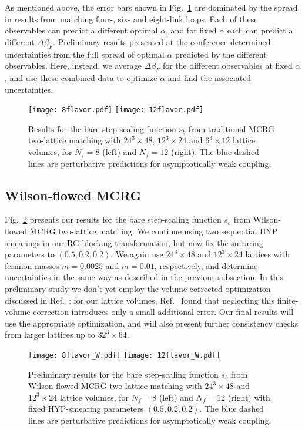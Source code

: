 \documentclass{PoS}
\newcommand{\al}{\ensuremath{\alpha} }
\newcommand{\be}{\ensuremath{\beta} }
\newcommand{\De}{\ensuremath{\Delta} }
\newcommand{\X}{\ensuremath{\!\times\!} }
\newcommand{\refcite}[1]{Ref.~\cite{#1}}
\newcommand{\fig}[1]{Fig.~\ref{#1}}
\begin{document}
As mentioned above, the error bars shown in \fig{fig:MCRG} are dominated by the spread in results from matching four-, six- and eight-link loops.
Each of these observables can predict a different optimal $\al$, and for fixed \al each can predict a different $\De\be_F$.
Preliminary results presented at the conference determined uncertainties from the full spread of optimal \al predicted by the different observables.
Here, instead, we average $\De\be_F$ for the different observables at fixed $\al$, and use these combined data to optimize \al and find the associated uncertainties.

\begin{figure}[htpb]
  \texttt{[image: 8flavor.pdf]}\hfill
  \texttt{[image: 12flavor.pdf]}
  \caption{Results for the bare step-scaling function $s_b$ from traditional MCRG two-lattice matching with $24^3\X48$, $12^3\X24$ and $6^3\X12$ lattice volumes, for $N_f = 8$ (left) and $N_f = 12$ (right).  The blue dashed lines are perturbative predictions for asymptotically weak coupling.}
  \label{fig:MCRG}
\end{figure}



\subsection{\label{sec:WMCRGresults}Wilson-flowed MCRG} %
\fig{fig:WMCRG} presents our results for the bare step-scaling function $s_b$ from Wilson-flowed MCRG two-lattice matching.
We continue using two sequential HYP smearings in our RG blocking transformation, but now fix the smearing parameters to $(0.5, 0.2, 0.2)$.
We again use $24^3\X48$ and $12^3\X24$ lattices with fermion masses $m = 0.0025$ and $m = 0.01$, respectively, and determine uncertainties in the same way as described in the previous subsection.
In this preliminary study we don't yet employ the volume-corrected optimization discussed in \refcite{Hasenfratz:2011xn}; for our lattice volumes, \refcite{Hasenfratz:2011xn} found that neglecting this finite-volume correction introduces only a small additional error.
Our final results will use the appropriate optimization, and will also present further consistency checks from larger lattices up to $32^3\X64$.

\begin{figure}[htpb]
  \texttt{[image: 8flavor\_W.pdf]}\hfill
  \texttt{[image: 12flavor\_W.pdf]}
  \caption{Preliminary results for the bare step-scaling function $s_b$ from Wilson-flowed MCRG two-lattice matching with $24^3\X48$ and $12^3\X24$ lattice volumes, for $N_f = 8$ (left) and $N_f = 12$ (right) with fixed HYP-smearing parameters $(0.5, 0.2, 0.2)$.  The blue dashed lines are perturbative predictions for asymptotically weak coupling.}
  \label{fig:WMCRG}
\end{figure}
\end{document}
